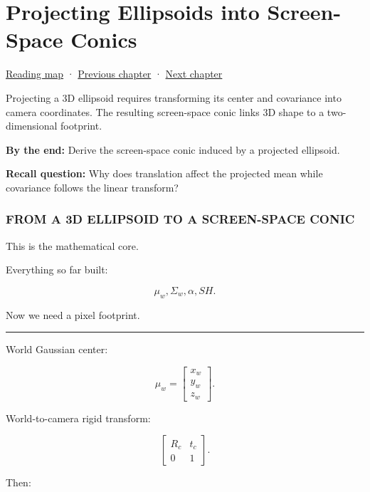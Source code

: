 \hypertarget{04-visual-computing-ii-ch038}{}
\chapter{Projecting Ellipsoids into Screen-Space Conics}\label{04-visual-computing-ii-ch038-projecting-ellipsoids-into-screen-space-conics}

\hyperref[volume-reading-map]{Reading map} · \hyperref[04-visual-computing-ii-ch037-gaussian-splatting-and-editable-captured-worlds]{Previous chapter} · \hyperref[04-visual-computing-ii-ch039-tiling-ordering-and-compositing-at-scale]{Next chapter}

Projecting a 3D ellipsoid requires transforming its center and covariance into camera coordinates. The resulting screen-space conic links 3D shape to a two-dimensional footprint.

\textbf{By the end:} Derive the screen-space conic induced by a projected ellipsoid.

\textbf{Recall question:} Why does translation affect the projected mean while covariance follows the linear transform?

\subsection{FROM A 3D ELLIPSOID TO A SCREEN-SPACE CONIC}\label{04-visual-computing-ii-ch038-from-a-3d-ellipsoid-to-a-screen-space-conic}

This is the mathematical core.

Everything so far built:

\[
\mu_w,
\Sigma_w,
\alpha,
SH.
\]

Now we need a pixel footprint.

\begin{center}\rule{0.5\linewidth}{0.5pt}\end{center}

World Gaussian center:

\[
\mu_w=
\begin{bmatrix}
x_w\\y_w\\z_w
\end{bmatrix}.
\]

World-to-camera rigid transform:

\[
\begin{bmatrix}
R_c&t_c\\
0&1
\end{bmatrix}.
\]

Then:

